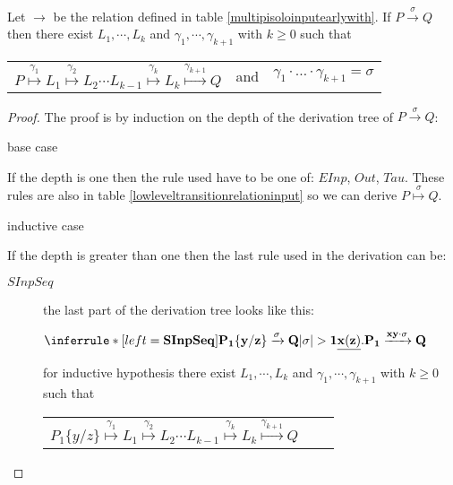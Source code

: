 \begin{proposition}\label{equivalencehightolowinput}
  Let $\rightarrow$ be the relation defined in table \ref{multipisoloinputearlywith}. If $P\xrightarrow{\sigma} Q$ then there exist $L_{1}, \cdots, L_{k}$ and $\gamma_{1}, \cdots, \gamma_{k+1}$ with $k\geq 0$ such that 
  \begin{center}
    \begin{tabular}{lll}
      $P \stackrel{\gamma_{1}}{\longmapsto} L_{1}  \stackrel{\gamma_{2}}{\longmapsto} L_{2} \cdots L_{k-1} \stackrel{\gamma_{k}}{\longmapsto} L_{k} \stackrel{\gamma_{k+1}}{\longmapsto} Q$ 
    &
      and
    &
      $\gamma_{1} \cdot \ldots \cdot \gamma_{k+1} = \sigma$  
    \end{tabular}
  \end{center}
  \begin{proof}
    The proof is by induction on the depth of the derivation tree of $P\xrightarrow{\sigma} Q$:
    \begin{description}
      \item[base case]
    \end{description}
	If the depth is one then the rule used have to be one of: $EInp$, $Out$, $Tau$. These rules are also in table \ref{lowleveltransitionrelationinput} so we can derive $P \stackrel{\sigma}{\longmapsto}Q$.
    \begin{description}
      \item[inductive case]
    \end{description}
	If the depth is greater than one then the last rule used in the derivation can be:
	\begin{description}
	  \item[$SInpSeq$]
	    the last part of the derivation tree looks like this:
	    \begin{center}
	      $\inferrule* [left=\bf{SInpSeq}]{
		  P_{1}\{y/z\} \xrightarrow{\sigma} Q
		\\
		  |\sigma|>1
	      }{
		\underline{x(z)}.P_{1} \xrightarrow{xy \cdot \sigma} Q
	      }$	      
	    \end{center}
	    for inductive hypothesis there exist $L_{1}, \cdots, L_{k}$ and $\gamma_{1}, \cdots, \gamma_{k+1}$ with $k\geq 0$ such that 
	    \begin{center}
	      \begin{tabular}{lll}
		$P_{1}\{y/z\} \stackrel{\gamma_{1}}{\longmapsto} L_{1} \stackrel{\gamma_{2}}{\longmapsto} L_{2} \cdots L_{k-1} \stackrel{\gamma_{k}}{\longmapsto} L_{k} \stackrel{\gamma_{k+1}}{\longmapsto} Q$ 

\end{tabular}
\end{center}
\end{description}
\end{proof}
\end{proposition}
